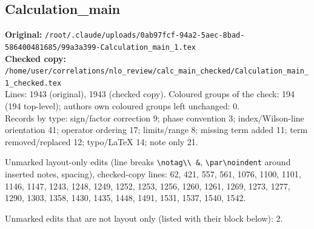 \documentclass[10pt]{article}
\begin{document}
\subsection{Calculation\_main}\label{sec:file-calc_main}
\noindent\textbf{Original:} \texttt{/root/.claude/uploads/0ab97fcf-94a2-5aec-8bad-586400481685/99a3a399-Calculation\_main\_1.tex}\\\textbf{Checked copy:} \texttt{/home/user/correlations/nlo\_review/calc\_main\_checked/Calculation\_main\_1\_checked.tex}\\
Lines: 1943 (original), 1943 (checked copy). Coloured groups of the check: 194 (194 top-level); author\textquotesingle s own coloured groups left unchanged: 0.\\
Records by type: sign/factor correction 9; phase convention 3; index/Wilson-line orientation 41; operator ordering 17; limits/range 8; missing term added 11; term removed/replaced 12; typo/LaTeX 14; note only 21.
\par\noindent Unmarked layout-only edits (line breaks \texttt{\textbackslash notag\textbackslash\textbackslash\ \&}, \texttt{\textbackslash par\textbackslash noindent} around inserted notes, spacing), checked-copy lines: 62, 421, 557, 561, 1076, 1100, 1101, 1146, 1147, 1243, 1248, 1249, 1252, 1253, 1256, 1260, 1261, 1269, 1273, 1277, 1290, 1303, 1358, 1430, 1435, 1448, 1491, 1531, 1537, 1540, 1542.
\par\noindent Unmarked edits that are not layout only (listed with their block below): 2.
\end{document}
